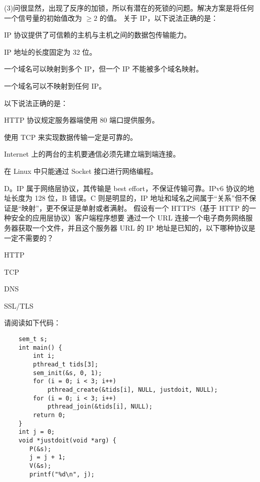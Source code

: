 \begin{problems}
        (3)问很显然，出现了反序的加锁，所以有潜在的死锁的问题。解决方案是将任何一个信号量的初始值改为 $\geq 2$ 的值。
         关于 IP，以下说法正确的是：
        \begin{choices}
            \item IP 协议提供了可信赖的主机与主机之间的数据包传输能力。
            \item IP 地址的长度固定为 32 位。
            \item 一个域名可以映射到多个 IP，但一个 IP 不能被多个域名映射。
            \item 一个域名可以不映射到任何 IP。
        \end{choices}
         以下说法正确的是：
        \begin{choices}
            \item HTTP 协议规定服务器端使用 80 端口提供服务。
            \item 使用 TCP 来实现数据传输一定是可靠的。
            \item Internet 上的两台的主机要通信必须先建立端到端连接。
            \item 在 Linux 中只能通过 Socket 接口进行网络编程。
        \end{choices}
        \sol D。IP 属于网络层协议，其传输是 best effort，不保证传输可靠。IPv6 协议的地址长度为 128 位，B 错误。C 则是明显的，IP 地址和域名之间属于“关系”但不保证是“映射”，更不保证是单射或者满射。
         假设有一个 HTTPS（基于 HTTP 的一种安全的应用层协议）客户端程序想要 通过一个 URL 连接一个电子商务网络服务器获取一个文件，并且这个服务器 URL 的 IP 地址是已知的，以下哪种协议是一定不需要的？
        \begin{choices}
            \item HTTP
            \item TCP
            \item DNS
            \item SSL/TLS
        \end{choices}
         请阅读如下代码：
        \begin{verbatim}
    sem_t s;
    int main() {
        int i;
        pthread_t tids[3];
        sem_init(&s, 0, 1);
        for (i = 0; i < 3; i++)
            pthread_create(&tids[i], NULL, justdoit, NULL);
        for (i = 0; i < 3; i++)
            pthread_join(&tids[i], NULL);
        return 0;
    }
    int j = 0;
    void *justdoit(void *arg) {
       P(&s);
       j = j + 1;
       V(&s);
       printf("%d\n", j);

\end{verbatim}
\end{problems}

